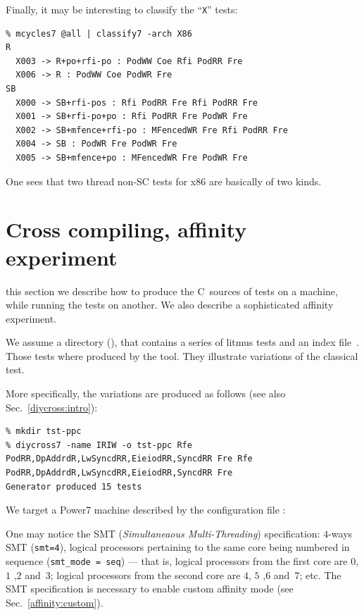 Finally, it may be interesting to classify the ``\texttt{X}'' tests:
\begin{verbatim}
% mcycles7 @all | classify7 -arch X86
R
  X003 -> R+po+rfi-po : PodWW Coe Rfi PodRR Fre
  X006 -> R : PodWW Coe PodWR Fre
SB
  X000 -> SB+rfi-pos : Rfi PodRR Fre Rfi PodRR Fre
  X001 -> SB+rfi-po+po : Rfi PodRR Fre PodWR Fre
  X002 -> SB+mfence+rfi-po : MFencedWR Fre Rfi PodRR Fre
  X004 -> SB : PodWR Fre PodWR Fre
  X005 -> SB+mfence+po : MFencedWR Fre PodWR Fre
\end{verbatim}
One sees that two thread non-SC tests for x86 are basically of two kinds.




\section{Cross compiling, \label{affinity:experiment}affinity experiment}
 this section we describe how to produce the C~sources of tests
on a machine, while running the tests on another.
We also describe a sophisticated affinity experiment.

We assume a directory %
\ifhevea{} ()\fi,
that contains a series of litmus tests
and an index file~.
Those tests where produced by the \diycross{}
tool. They illustrate variations of the
classical  test.
\ifhevea\begin{center}\end{center}\fi
More specifically, the  variations are produced as follows
(see also Sec.~\ref{diycross:intro}):
\begin{verbatim}
% mkdir tst-ppc
% diycross7 -name IRIW -o tst-ppc Rfe PodRR,DpAddrdR,LwSyncdRR,EieiodRR,SyncdRR Fre Rfe PodRR,DpAddrdR,LwSyncdRR,EieiodRR,SyncdRR Fre
Generator produced 15 tests
\end{verbatim}


We target a Power7 machine described by the configuration file
:

One may notice the SMT (\emph{Simultaneaous Multi-Threading}) specification:
$4$-ways SMT (\verb+smt=4+), logical processors pertaining
to the same core being numbered in sequence (\verb+smt_mode = seq+) ---
that is, logical processors from the first core are $0$, $1$ ,$2$ and~$3$;
logical processors from the second core are $4$, $5$ ,$6$ and~$7$; etc.
The SMT specification is necessary to enable
custom affinity mode
(see Sec.~\ref{affinity:custom}).

